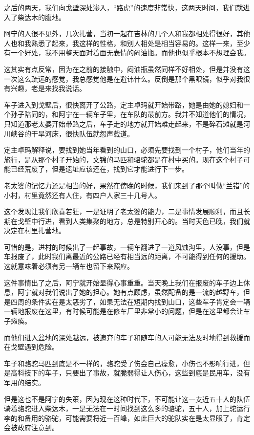 之后的两天，我们向戈壁深处渗入，“路虎”的速度非常快，这两天时间，我们就进入了柴达木的腹地。

阿宁的人很不见外，几次扎营，当初一起在吉林的几个人和我都相处得很好，其他人也和我熟悉了起来，我这样的性格，和别人相处是相当容易的。这样一来，至少有一个好处，我不用整天面对着面无表情的闷油瓶。而他也似乎根本不想理会我。

这其实有点反常，因为在之前的接触中，闷油瓶虽然同样不好相处，但是并没有这一次这么疏远的感觉，我总感觉他是在避讳什么。反倒是那个黑眼镜，似乎对我很有兴趣，老是来找我说话。

车子进入到戈壁后，很快离开了公路，定主卓玛就开始带路，她是由她的媳妇和一个孙子陪同的，和阿宁在一辆车子里，在车队的最前方。我并不知道他们的情况，只知道那老太婆开始带路之后，车子走的地方就开始难走起来，不是碎石滩就是河川峡谷的干旱河床，很快队伍就怨声载道。

定主卓玛解释说，要找到她当年看到的山口，必须先要找到一个村子，他们当年的旅行，是从那个村子开始的，文锦的马匹和骆驼都是在村中买的。现在这个村子可能已经荒废了，但是遗址应该还在，找到它才能进行下一步。

老太婆的记忆力还是相当的好，果然在傍晚的时候，我们来到了那个叫做“兰错”的小村，村里竟然还有人住，有四户人家三十几号人。

这个发现让我们欣喜若狂，一是证明了老太婆的能力，二是事情发展顺利，而且长期在戈壁中行进，看到人类集聚的地方，总是特别开心的。当时天色已晚，我们就决定在村里扎营地。

可惜的是，进村的时候出了一起事故，一辆车翻进了一道风蚀沟里，人没事，但是车报废了，此时我们离最近的公路已经有相当远的距离，不可能得到任何的援助。这就意味着必须有另一辆车也留下来照应。

这件事情出了之后，阿宁就开始显得心事重重。当天晚上我们在报废的车子边上休息，阿宁就对我们说出了她的担心。她有点顾虑，虽然配备的是一流的越野车，但是四周的条件实在是太恶劣了，如果无法在短期内找到山口，这些车子肯定会一辆一辆地报废在这里，有时候可能是在修车厂里非常小的问题，但是在这里都会让车子瘫痪。

而他们进入盆地的深处越远，被遗弃的车子和随车的人可能无法及时地得到救援而在戈壁遇到危险。

车子和骆驼马匹到底是不一样的，骆驼受了伤会自己痊愈，小伤也不影响行进，但是高科技下的车子，只要出了事故，就脆弱得让人伤心，这些到底是民用车，没有军用的结实。

但是这也不是阿宁的失策，因为现在这种时代下，不可能让这一支近五十人的队伍骑着骆驼进入柴达木，一是无法在一时间找到这么多的骆驼，五十人，加上驼运行李的和备用的骆驼，可能需要将近一百峰，如此巨大的驼队实在是太显眼了，肯定会被政府注意到。

